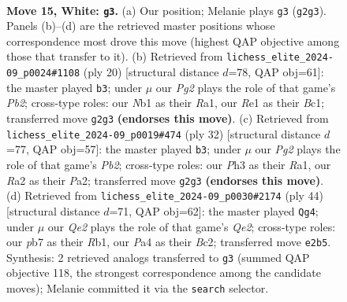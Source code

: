 \documentclass[11pt]{article}
\begin{document}
\clearpage

\begin{figure}[p]\centering
\begin{subfigure}{0.46\textwidth}\centering
\resizebox{\linewidth}{!}{%
\newchessgame
\chessboard[
  setfen={rnbqr1k1/pp3pb1/4pnpp/3p4/P2P4/1B3N1P/RPP1QPP1/1NB1R1K1 w - - 3 15},
  showmover=false,
  pgfstyle=straightmove, color=movearrow, markmove={g2-g3}
]}
\caption{}
\end{subfigure}\hfill
\begin{subfigure}{0.46\textwidth}\centering
\resizebox{\linewidth}{!}{%
\newchessgame
\chessboard[
  setfen={r1bq1rk1/1p2ppbp/p2p1np1/8/2P5/2N3P1/PP1QPPBP/R1B2RK1 w - - 0 11},
  showmover=false,
  pgfstyle=straightmove, color=movearrow, markmove={b2-b3}
]}
\caption{}
\end{subfigure}
\\[4pt]
\begin{subfigure}{0.46\textwidth}\centering
\resizebox{\linewidth}{!}{%
\newchessgame
\chessboard[
  setfen={r2qr1kb/ppp2p1p/2bp2pB/4n3/4P2P/2N3P1/PPPQ1PB1/R3R1K1 w - - 1 17},
  showmover=false,
  pgfstyle=straightmove, color=movearrow, markmove={b2-b3}
]}
\caption{}
\end{subfigure}\hfill
\begin{subfigure}{0.46\textwidth}\centering
\resizebox{\linewidth}{!}{%
\newchessgame
\chessboard[
  setfen={r3rbk1/1pqnnppb/7p/p3p3/2Pp3N/PP1P2NP/2B1QPP1/1RB1R1K1 w - - 8 23},
  showmover=false,
  pgfstyle=straightmove, color=movearrow, markmove={e2-g4}
]}
\caption{}
\end{subfigure}
\caption{\textbf{Move 15, White: \texttt{g3}.} (a) Our position; Melanie plays \texttt{g3} (\texttt{g2g3}). Panels (b)--(d) are the retrieved master positions whose correspondence most drove this move (highest QAP objective among those that transfer to it). (b) Retrieved from \texttt{lichess\_elite\_2024-09\_p0024\#1108} (ply 20) [structural distance $d$=78, QAP obj=61]: the master played \texttt{b3}; under $\mu$ our \emph{Pg2} plays the role of that game's \emph{Pb2}; cross-type roles: our \emph{N}b1 as their \emph{R}a1, our \emph{R}e1 as their \emph{B}c1; transferred move \texttt{g2g3} \textbf{(endorses this move)}. (c) Retrieved from \texttt{lichess\_elite\_2024-09\_p0019\#474} (ply 32) [structural distance $d$=77, QAP obj=57]: the master played \texttt{b3}; under $\mu$ our \emph{Pg2} plays the role of that game's \emph{Pb2}; cross-type roles: our \emph{P}h3 as their \emph{R}a1, our \emph{R}a2 as their \emph{P}a2; transferred move \texttt{g2g3} \textbf{(endorses this move)}. (d) Retrieved from \texttt{lichess\_elite\_2024-09\_p0030\#2174} (ply 44) [structural distance $d$=71, QAP obj=62]: the master played \texttt{Qg4}; under $\mu$ our \emph{Qe2} plays the role of that game's \emph{Qe2}; cross-type roles: our \emph{p}b7 as their \emph{R}b1, our \emph{P}a4 as their \emph{B}c2; transferred move \texttt{e2b5}. Synthesis: 2 retrieved analogs transferred to \texttt{g3} (summed QAP objective 118, the strongest correspondence among the candidate moves); Melanie committed it via the \texttt{search} selector.}
\label{fig:thought-m28}
\end{figure}
\end{document}
